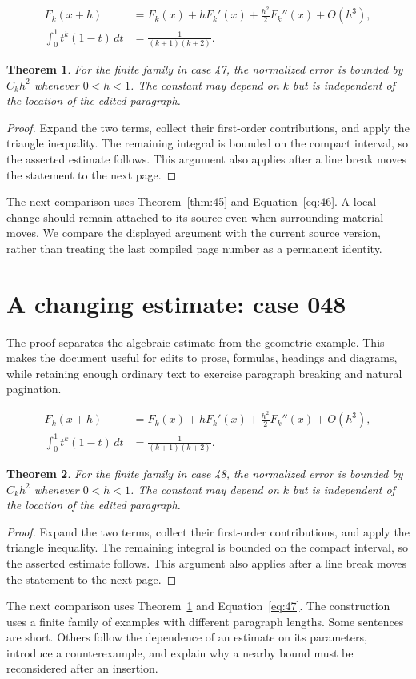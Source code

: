 \documentclass[a4paper,10pt]{article}
\newtheorem{theorem}{Theorem}[section]
\begin{document}
\lipsum[19-20]
\begin{align}\label{eq:46}
 F_k(x+h)&=F_k(x)+hF_k'(x)+\frac{h^2}{2}F_k''(x)+O(h^3),\\
 \int_0^1 t^k(1-t)\,dt&=\frac{1}{(k+1)(k+2)}.
\end{align}
\begin{theorem}\label{thm:46}
For the finite family in case 47, the normalized error is bounded by $C_k h^2$ whenever $0<h<1$. The constant may depend on $k$ but is independent of the location of the edited paragraph.
\end{theorem}
\begin{proof}
Expand the two terms, collect their first-order contributions, and apply the
triangle inequality. The remaining integral is bounded on the compact interval,
so the asserted estimate follows. This argument also applies after a line break
moves the statement to the next page.
\end{proof}
The next comparison uses Theorem~\ref{thm:45} and Equation~\ref{eq:46}. A local change should remain attached to its source even when surrounding material moves. We compare the displayed argument with the current source version, rather than treating the last compiled page number as a permanent identity.

\lipsum[8]

\section{A changing estimate: case 048}\label{unit:47}
The proof separates the algebraic estimate from the geometric example. This makes the document useful for edits to prose, formulas, headings and diagrams, while retaining enough ordinary text to exercise paragraph breaking and natural pagination.

\lipsum[22-23]
\begin{align}\label{eq:47}
 F_k(x+h)&=F_k(x)+hF_k'(x)+\frac{h^2}{2}F_k''(x)+O(h^3),\\
 \int_0^1 t^k(1-t)\,dt&=\frac{1}{(k+1)(k+2)}.
\end{align}
\begin{theorem}\label{thm:47}
For the finite family in case 48, the normalized error is bounded by $C_k h^2$ whenever $0<h<1$. The constant may depend on $k$ but is independent of the location of the edited paragraph.
\end{theorem}
\begin{proof}
Expand the two terms, collect their first-order contributions, and apply the
triangle inequality. The remaining integral is bounded on the compact interval,
so the asserted estimate follows. This argument also applies after a line break
moves the statement to the next page.
\end{proof}
The next comparison uses Theorem~\ref{thm:46} and Equation~\ref{eq:47}. The construction uses a finite family of examples with different paragraph lengths. Some sentences are short. Others follow the dependence of an estimate on its parameters, introduce a counterexample, and explain why a nearby bound must be reconsidered after an insertion.
\end{document}
